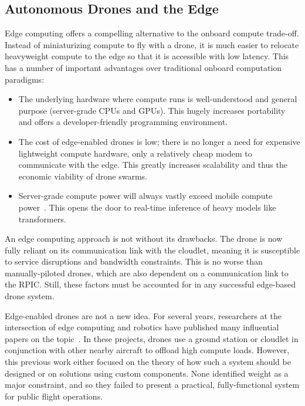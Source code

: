 \subsection{Autonomous Drones and the Edge}
\label{sec:drone-and-the-edge}
Edge computing offers a compelling alternative to the onboard compute trade-off. Instead of miniaturizing compute to fly with a drone, it is much easier to relocate heavyweight compute to the edge so that it is accessible with low latency. This has a number of important advantages over traditional onboard computation paradigms:

\begin{itemize}
    \item The underlying hardware where compute runs is well-understood and general purpose (server-grade CPUs and GPUs). This hugely increases portability and offers a developer-friendly programming environment.
    \item The cost of edge-enabled drones is low; there is no longer a need for expensive lightweight compute hardware, only a relatively cheap modem to communicate with the edge. This greatly increases scalability and thus the economic viability of drone swarms.
    \item Server-grade compute power will always vastly exceed mobile compute power~\cite{Qi2012}. This opens the door to real-time inference of heavy models like transformers.
\end{itemize}

An edge computing approach is not without its drawbacks. The drone is now fully reliant on its communication link with the cloudlet, meaning it is susceptible to service disruptions and bandwidth constraints. This is no worse than manually-piloted drones, which are also dependent on a communication link to the RPIC. Still, these factors must be accounted for in any successful edge-based drone system.

Edge-enabled drones are not a new idea. For several years, researchers at the intersection of edge computing and robotics have published many influential papers on the topic~\cite{Wang2017,Bertizzolo2020,Asaamoning2021,Gharibi2016}. In
these projects, drones use a ground station or cloudlet in conjunction with other nearby aircraft to offload high compute loads. However, this previous work either focused on the theory of how such a system should be designed or on solutions using custom components. None identified weight as a major constraint, and so they failed to present a practical, fully-functional system for public flight operations.

